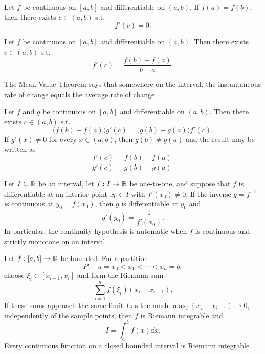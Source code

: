     \begin{theorem}
        Let $f$ be continuous on $[a,b]$ and differentiable on $(a,b)$. If
        $f(a)=f(b)$, then there exists $c\in(a,b)$ s.t.
        \[
            f'(c)=0.
        \]
    \end{theorem}

    \begin{theorem}
        Let $f$ be continuous on $[a,b]$ and differentiable on $(a,b)$. Then
        there exists $c\in(a,b)$ s.t.
        \[
            f'(c)
            =
            \frac{f(b)-f(a)}{b-a}.
        \]
    \end{theorem}

    \begin{idea}
        The Mean Value Theorem says that somewhere on the interval, the
        instantaneous rate of change equals the average rate of change.
    \end{idea}

    \begin{theorem}
        Let $f$ and $g$ be continuous on $[a,b]$ and differentiable on
        $(a,b)$. Then there exists $c\in(a,b)$ s.t.
        \[
            \bigl(f(b)-f(a)\bigr)g'(c)
            =
            \bigl(g(b)-g(a)\bigr)f'(c).
        \]
        If $g'(x)\neq 0$ for every $x\in(a,b)$, then $g(b)\neq g(a)$
        and the result may be written as
        \[
            \frac{f'(c)}{g'(c)}
            =
            \frac{f(b)-f(a)}{g(b)-g(a)}.
        \]
    \end{theorem}

    \begin{theorem}
        Let $I\subseteq\mathbb{R}$ be an interval, let $f:I\to\mathbb{R}$ be one-to-one, and
        suppose that $f$ is differentiable at an interior point $x_0\in I$ with
        $f'(x_0)\neq0$. If the inverse $g=f^{-1}$ is continuous at
        $y_0=f(x_0)$, then $g$ is differentiable at $y_0$ and
        \[
            g'(y_0)=\frac{1}{f'(x_0)}.
        \]
        In particular, the continuity hypothesis is automatic when $f$ is
        continuous and strictly monotone on an interval.
    \end{theorem}

    \begin{definition}
        Let $f:[a,b]\to\mathbb{R}$ be bounded. For a partition
        \[
            P:\quad a=x_0<x_1<\cdots<x_n=b,
        \]
        choose $\xi_i\in[x_{i-1},x_i]$ and form the Riemann sum
        \[
            \sum_{i=1}^{n}f(\xi_i)(x_i-x_{i-1}).
        \]
        If these sums approach the same limit $I$ as the mesh
        $\max_i(x_i-x_{i-1})\to0$, independently of the sample points, then
        $f$ is Riemann integrable and
        \[
            I=\int_a^b f(x)\dd x.
        \]
        Every continuous function on a closed bounded interval is Riemann
        integrable.
    \end{definition}

